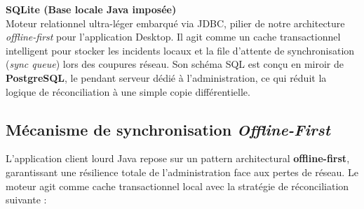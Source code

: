 \documentclass[12pt,a4paper]{article}
\begin{document}
\textbf{SQLite (Base locale Java imposée)} \\
Moteur relationnel ultra-léger embarqué via JDBC, pilier de notre architecture \textit{offline-first} pour l'application Desktop.
Il agit comme un cache transactionnel intelligent pour stocker les incidents locaux et la file d'attente de synchronisation
(\textit{sync queue}) lors des coupures réseau. Son schéma SQL est conçu en miroir de \textbf{PostgreSQL}, le pendant serveur
dédié à l'administration, ce qui réduit la logique de réconciliation à une simple copie différentielle.

\newpage

\subsection{Mécanisme de synchronisation \textit{Offline-First}}

L'application client lourd Java repose sur un pattern architectural \textbf{offline-first}, garantissant une résilience totale de l'administration
face aux pertes de réseau. Le moteur  agit comme cache transactionnel local avec la stratégie de réconciliation suivante :
\end{document}

